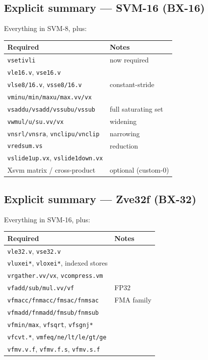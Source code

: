 \subsection{Explicit summary --- SVM-16 (BX-16)}

Everything in SVM-8, plus:

\begin{center}\small
\begin{tabular}{@{}ll@{}}
\toprule
Required & Notes \\
\midrule
\texttt{vsetivli} & now required \\
\texttt{vle16.v}, \texttt{vse16.v} & \\
\texttt{vlse8/16.v}, \texttt{vsse8/16.v} & constant-stride \\
\texttt{vminu/min/maxu/max.vv/vx} & \\
\texttt{vsaddu/vsadd/vssubu/vssub} & full saturating set \\
\texttt{vwmul/u/su.vv/vx} & widening \\
\texttt{vnsrl/vnsra}, \texttt{vnclipu/vnclip} & narrowing \\
\texttt{vredsum.vs} & reduction \\
\texttt{vslide1up.vx}, \texttt{vslide1down.vx} & \\
Xsvm matrix / cross-product & optional (custom-0) \\
\bottomrule
\end{tabular}
\end{center}

\subsection{Explicit summary --- Zve32f (BX-32)}

Everything in SVM-16, plus:

\begin{center}\small
\begin{tabular}{@{}ll@{}}
\toprule
Required & Notes \\
\midrule
\texttt{vle32.v}, \texttt{vse32.v} & \\
\texttt{vluxei*}, \texttt{vloxei*}, indexed stores & \\
\texttt{vrgather.vv/vx}, \texttt{vcompress.vm} & \\
\texttt{vfadd/sub/mul.vv/vf} & FP32 \\
\texttt{vfmacc/fnmacc/fmsac/fnmsac} & FMA family \\
\texttt{vfmadd/fnmadd/fmsub/fnmsub} & \\
\texttt{vfmin/max}, \texttt{vfsqrt}, \texttt{vfsgnj*} & \\
\texttt{vfcvt.*}, \texttt{vmfeq/ne/lt/le/gt/ge} & \\
\texttt{vfmv.v.f}, \texttt{vfmv.f.s}, \texttt{vfmv.s.f} & \\
\bottomrule
\end{tabular}
\end{center}

